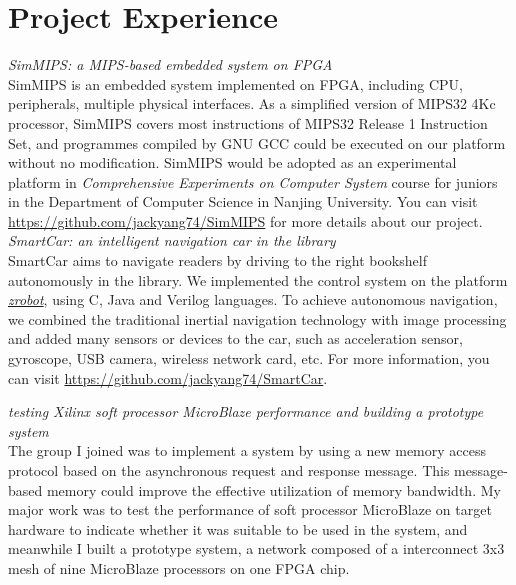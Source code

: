 \documentclass[11pt,a4paper]{moderncv}
\begin{document}
\section{Project Experience}
{
    \smallskip
    \emph{SimMIPS: a MIPS-based embedded system on FPGA}
    \medskip \\
    SimMIPS is an embedded system implemented on FPGA, including CPU, peripherals, multiple physical interfaces.
    As a simplified version of MIPS32 4Kc processor, SimMIPS covers most instructions of MIPS32 Release 1 Instruction Set, and programmes compiled by GNU GCC could be executed on our platform without no modification.
    SimMIPS would be adopted as an experimental platform in \emph{Comprehensive Experiments on Computer System} course for juniors in the Department of Computer Science in Nanjing University.
    You can visit \url{https://github.com/jackyang74/SimMIPS} for more details about our project.
}
{
    \smallskip
    \emph{SmartCar: an intelligent navigation car in the library}
    \medskip  \\
    SmartCar aims to navigate readers by driving to the right bookshelf autonomously in the library.
    We implemented the control system on the platform \href{http://zrobot.org/}{\emph{zrobot}}, using C, Java and Verilog languages.
    To achieve autonomous navigation, we combined the traditional inertial navigation technology with image processing and added many sensors or devices to the car, such as acceleration sensor, gyroscope, USB camera, wireless network card, etc. For more information, you can visit \url{https://github.com/jackyang74/SmartCar}.
}

{
    \smallskip
    \emph{testing Xilinx soft processor MicroBlaze performance and building a prototype system}
    \medskip  \\
    The group I joined was to implement a system by using a new memory access protocol based on the asynchronous request and response message.
    This message-based memory could improve the effective utilization of memory bandwidth.
    My major work was to test the performance of soft processor MicroBlaze on target hardware to indicate whether it was suitable to be used in the system, and meanwhile I built a prototype system, a network composed of a interconnect 3x3 mesh of nine MicroBlaze processors on one FPGA chip.
}
\end{document}
